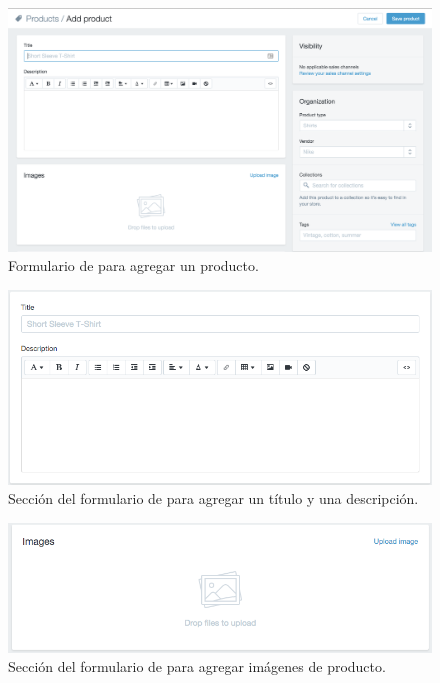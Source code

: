 
\begin{figure}[H]
	\centering
	\includegraphics[width=1\textwidth]{figuras/productos/examples/shopify_product_generic_view.png}
	\caption{Formulario de \shopifyNAME para agregar un producto.}
	\label{figure:productos:example:shopify_product_generic_view}
\end{figure}

\begin{figure}[H]
	\centering
	\includegraphics[width=1\textwidth]{figuras/productos/examples/shopify_product_main.png}
	\caption{Sección del formulario de \shopifyNAME para agregar un título y una descripción.}
	\label{figure:productos:example:shopify_product_main}
\end{figure}

\begin{figure}[H]
	\centering
	\includegraphics[width=1\textwidth]{figuras/productos/examples/shopify_product_multimedia.png}
	\caption{Sección del formulario de \shopifyNAME para agregar imágenes de producto.}
	\label{figure:productos:example:shopify_product_multimedia}
\end{figure}


